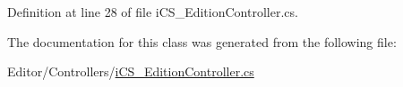 Definition at line 28 of file i\+C\+S\+\_\+\+Edition\+Controller.\+cs.



The documentation for this class was generated from the following file\+:\begin{DoxyCompactItemize}
\item 
Editor/\+Controllers/\hyperlink{i_c_s___edition_controller_8cs}{i\+C\+S\+\_\+\+Edition\+Controller.\+cs}\end{DoxyCompactItemize}
